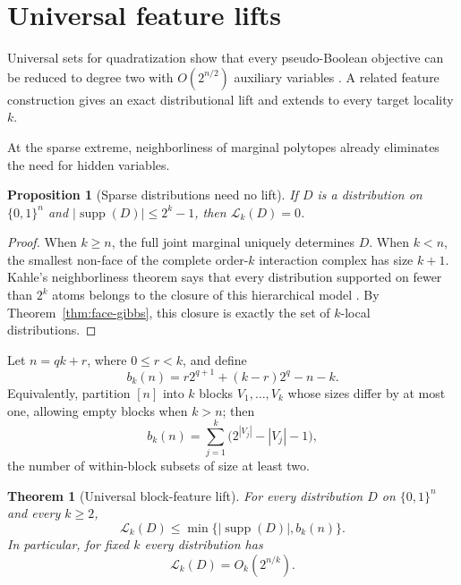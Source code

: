\documentclass{article}
\newcommand{\LC}{\mathcal{L}}
\newcommand{\supp}{\operatorname{supp}}
\newcommand{\bits}{\{0,1\}}
\newtheorem{theorem}{Theorem}
\newtheorem{proposition}{Proposition}
\begin{document}
\section{Universal feature lifts}\label{sec:universal-lifts}

Universal sets for quadratization show that every pseudo-Boolean objective can
be reduced to degree two with $O(2^{n/2})$ auxiliary variables
\cite{anthony17}.  A related feature construction gives an exact
distributional lift and extends to every target locality $k$.

At the sparse extreme, neighborliness of marginal polytopes already eliminates
the need for hidden variables.

\begin{proposition}[Sparse distributions need no lift]
\label{prop:sparse-no-lift}
If $D$ is a distribution on $\bits^n$ and
$|\supp(D)|\le2^k-1$, then $\LC_k(D)=0$.
\end{proposition}

\begin{proof}
When $k\ge n$, the full joint marginal uniquely determines $D$.  When $k<n$,
the smallest non-face of the complete order-$k$ interaction complex has size
$k+1$.  Kahle's neighborliness theorem says that every distribution supported
on fewer than $2^k$ atoms belongs to the closure of this hierarchical model
\cite[Theorem~14]{kahle10}.  By Theorem~\ref{thm:face-gibbs}, this closure is
exactly the set of $k$-local distributions.
\end{proof}

Let $n=qk+r$, where $0\le r<k$, and define
\[
  b_k(n)
  =r2^{q+1}+(k-r)2^q-n-k.
\]
Equivalently, partition $[n]$ into $k$ blocks $V_1,\ldots,V_k$ whose sizes
differ by at most one, allowing empty blocks when $k>n$; then
\[
  b_k(n)=\sum_{j=1}^k\bigl(2^{|V_j|}-|V_j|-1\bigr),
\]
the number of within-block subsets of size at least two.

\begin{theorem}[Universal block-feature lift]
\label{thm:universal-lift}
For every distribution $D$ on $\bits^n$ and every $k\ge2$,
\[
  \LC_k(D)\le \min\{|\supp(D)|,b_k(n)\}.
\]
In particular, for fixed $k$ every distribution has
\[
  \LC_k(D)=O_k(2^{n/k}).
\]
\end{theorem}
\end{document}
